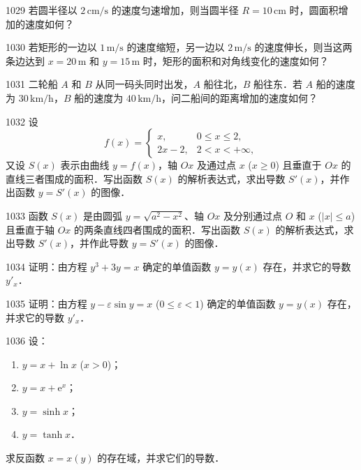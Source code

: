 \begin{prob}[S]{1029}
若圆半径以 $2\,\mathrm{cm/s}$ 的速度匀速增加，则当圆半径 $R = 10\,\mathrm{cm}$ 时，圆面积增加的速度如何？
\end{prob}

\begin{prob}[M]{1030}
若矩形的一边以 $1\,\mathrm{m/s}$ 的速度缩短，另一边以 $2\,\mathrm{m/s}$ 的速度伸长，则当这两条边达到 $x = 20\,\mathrm{m}$ 和 $y = 15\,\mathrm{m}$ 时，矩形的面积和对角线变化的速度如何？
\end{prob}

\begin{prob}[M]{1031}
二轮船 $A$ 和 $B$ 从同一码头同时出发，$A$ 船往北，$B$ 船往东．若 $A$ 船的速度为 $30\,\mathrm{km/h}$，$B$ 船的速度为 $40\,\mathrm{km/h}$，问二船间的距离增加的速度如何？
\end{prob}

\begin{prob}[L]{1032}
设
\[
f(x) = \begin{cases}
x, & 0 \leqslant x \leqslant 2, \\
2x - 2, & 2 < x < +\infty,
\end{cases}
\]
又设 $S(x)$ 表示由曲线 $y = f(x)$，轴 $Ox$ 及通过点 $x$ ($x \geqslant 0$) 且垂直于 $Ox$ 的直线三者围成的面积．写出函数 $S(x)$ 的解析表达式，求出导数 $S'(x)$，并作出函数 $y = S'(x)$ 的图像．
\end{prob}

\begin{prob}[L]{1033}
函数 $S(x)$ 是由圆弧 $y = \sqrt{a^2 - x^2}$、轴 $Ox$ 及分别通过点 $O$ 和 $x$ ($|x| \leqslant a$) 且垂直于轴 $Ox$ 的两条直线四者围成的面积．写出函数 $S(x)$ 的解析表达式，求出导数 $S'(x)$，并作此导数 $y = S'(x)$ 的图像．
\end{prob}


\begin{prob}[M]{1034}
证明：由方程 $y^3 + 3y = x$ 确定的单值函数 $y = y(x)$ 存在，并求它的导数 $y'_x$．
\end{prob}

\begin{prob}[M]{1035}
证明：由方程 $y - \varepsilon \sin y = x$ ($0 \leqslant \varepsilon < 1$) 确定的单值函数 $y = y(x)$ 存在，并求它的导数 $y'_x$．
\end{prob}

\begin{prob}[L]{1036}
设：
\begin{enumerate}[label=(\alph*), itemsep=2pt, topsep=3pt]
  \item $y = x + \ln x$ ($x > 0$)；
  \item $y = x + \mathrm{e}^x$；
  \item $y = \sinh x$；
  \item $y = \tanh x$．
\end{enumerate}
求反函数 $x = x(y)$ 的存在域，并求它们的导数．
\end{prob}

